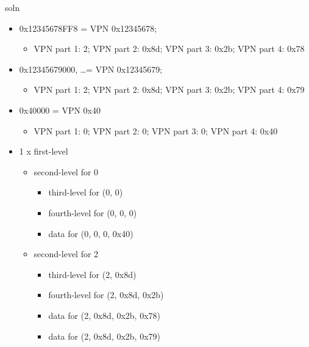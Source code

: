 \begin{frame}{soln}
    \begin{itemize}
        \item 0x12345678FF8 = VPN 0x12345678;
            \begin{itemize}
            \item VPN part 1: 2; VPN part 2: 0x8d; VPN part 3: 0x2b; VPN part 4: 0x78
            \end{itemize}
        \item 0x12345679000, \ldots = VPN 0x12345679;
            \begin{itemize}
            \item VPN part 1: 2; VPN part 2: 0x8d; VPN part 3: 0x2b; VPN part 4: 0x79
            \end{itemize}
        \item 0x40000 = VPN 0x40
            \begin{itemize}
            \item VPN part 1: 0; VPN part 2: 0; VPN part 3: 0; VPN part 4: 0x40
            \end{itemize}
        \item 1 x first-level
            \begin{itemize}
            \item second-level for 0
                \begin{itemize}
                    \item third-level for (0, 0)
                    \item fourth-level for (0, 0, 0)
                    \item data for (0, 0, 0, 0x40)
                \end{itemize}
            \item second-level for 2
                \begin{itemize}
                    \item third-level for (2, 0x8d)
                    \item fourth-level for (2, 0x8d, 0x2b)
                    \item data for (2, 0x8d, 0x2b, 0x78)
                    \item data for (2, 0x8d, 0x2b, 0x79)
                \end{itemize}
            \end{itemize}
    \end{itemize}
\end{frame}

